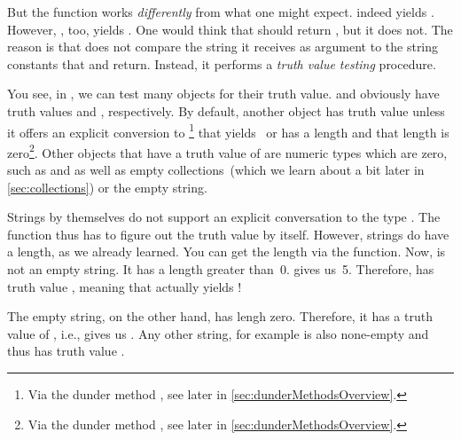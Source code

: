 But the function  works \emph{differently} from what one might expect.
 indeed yields .
However, , too, yields .
One would think that  should return , but it does not.
The reason is that  does not compare the string it receives as argument to the string constants that  and  return.
Instead, it performs a \emph{truth value testing} procedure.

You see, in \python, we can test many objects for their truth value.
 and  obviously have truth values  and , respectively.
By default, another object has truth value  unless it offers an explicit conversion to \footnote{%
Via the dunder method , see later in \cref{sec:dunderMethodsOverview}.} %
that yields~ or has a length and that length is zero\footnote{%
Via the dunder method , see later in \cref{sec:dunderMethodsOverview}.}.
Other objects that have a truth value of  are numeric types which are zero, such as  and  as well as empty collections~(which we learn about a bit later in \cref{sec:collections}) or the empty string.

Strings by themselves do not support an explicit conversation to the type .
The function  thus has to figure out the truth value by itself.
However, strings do have a length, as we already learned.
You can get the length via the  function.
Now,  is not an empty string.
It has a length greater than~0.
 gives us~5.
Therefore,  has truth value , meaning that  actually yields !

The empty string, on the other hand, has lengh zero.
Therefore, it has a truth value of , i.e.,  gives us .
Any other string, for example  is also none-empty and thus has truth value .

